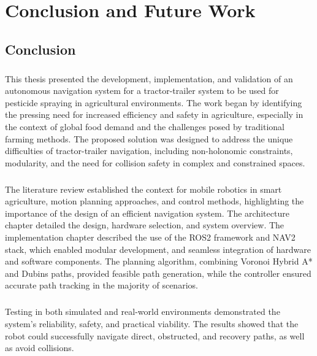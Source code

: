 
\chapter{Conclusion and Future Work}
\label{cha:conclusion}

\section{Conclusion}
\paragraph{}This thesis presented the development, implementation, and validation of an autonomous navigation system for a tractor-trailer 
system to be used for pesticide spraying in agricultural environments. The work began by identifying the pressing need for 
increased efficiency and safety in agriculture, especially in the context of global food demand and the challenges 
posed by traditional farming methods. The proposed solution was designed to address the unique difficulties of 
tractor-trailer navigation, including non-holonomic constraints, modularity, and the need for collision 
safety in complex and constrained spaces.

\paragraph{}The literature review established the context for mobile robotics in smart agriculture, 
motion planning approaches, and control methods, highlighting the importance of the design of an efficient 
navigation system. The architecture chapter detailed the design, hardware selection, and system overview. The 
implementation chapter described the use of the \gls{ROS2} framework and \gls{NAV2} stack, which enabled modular 
development, and seamless integration of hardware and software components. The planning 
algorithm, combining Voronoi Hybrid A* and Dubins paths, provided feasible path generation, while the 
controller ensured accurate path tracking in the majority of scenarios.

\paragraph{}Testing in both simulated and real-world environments demonstrated the system's reliability, 
safety, and practical viability. The results showed that the robot could successfully navigate direct, obstructed, and 
recovery paths, as well as avoid collisions.

